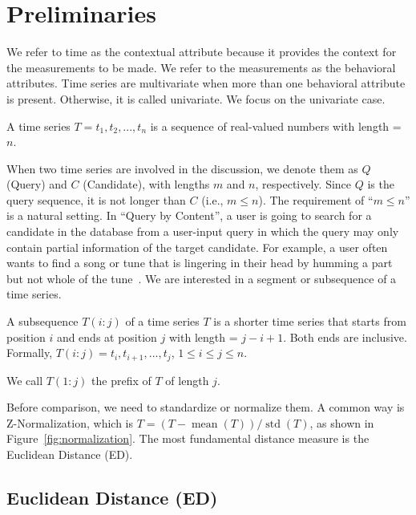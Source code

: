 \section{Preliminaries} \label{sec:preliminaries}

We refer to time as the contextual attribute because it provides the context for the measurements to be made.
We refer to the measurements as the behavioral attributes. 
Time series are multivariate when more than one behavioral attribute is present. Otherwise, it is called univariate.
We focus on the univariate case.

\begin{definition} 
    \label{def:ts}
    A time series $T = t_1, t_2, ..., t_n$ is a sequence of real-valued numbers with length = $n$.
\end{definition}

When two time series are involved in the discussion, we denote them as $Q$ (Query) and $C$ (Candidate), with lengths $m$ and $n$, respectively.
Since $Q$ is the query sequence, it is not longer than $C$ (i.e., $m \leq n$).
The requirement of ``$m \leq n$'' is a natural setting.
In ``Query by Content'', a user is going to search for a candidate in the database from a user-input query in which the query may only contain partial information of the target candidate.
For example, a user often wants to find a song or tune that is lingering in their head by humming a part but not whole of the tune~\cite{zhu2003warping}.
We are interested in a segment or subsequence of a time series. 

\begin{definition}[Subsequence] 
    \label{def:subseq}
    A subsequence $T(i:j)$ of a time series $T$ is a shorter time series that starts from position $i$ and ends at position $j$ with length = $j - i + 1$. Both ends are inclusive.
    Formally, $T(i:j) = t_i, t_{i+1}, ..., t_j$, $1 \leq i \leq j \leq n$.
\end{definition}
We call $T(1:j)$ the prefix of $T$ of length $j$.


Before comparison, we need to standardize or normalize them.
A common way is Z-Normalization, which is $T = (T-\operatorname{mean}(T))/\operatorname{std}(T)$, as shown in Figure~\ref{fig:normalization}. 
The most fundamental distance measure is the Euclidean Distance (ED).

\subsection{Euclidean Distance (ED)} %

